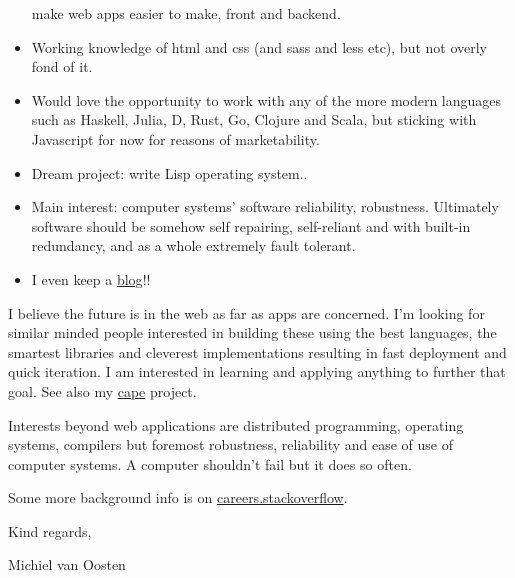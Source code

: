 \documentclass[11pt]{article}
\begin{document}
\begin{itemize}
  make web apps easier to make, front and backend.
\item Working knowledge of html and css (and sass and less etc), but not overly fond of it.
\item Would love the opportunity to work with any of the more modern languages such
  as Haskell, Julia, D, Rust, Go, Clojure and Scala, but sticking with
  Javascript for now for reasons of marketability.
\item Dream project: write Lisp operating system..
\item Main interest: computer systems' software reliability, robustness. Ultimately
  software should be somehow self repairing, self-reliant and with built-in
  redundancy, and as a whole extremely fault tolerant.
\item I even keep a \href{http://www.axion5.net}{blog}!!
\end{itemize}
  
I believe the future is in the web as far as apps are concerned. I'm looking for
similar minded people interested in building these using the best languages, the
smartest libraries and cleverest implementations resulting in fast deployment
and quick iteration. I am interested in learning and applying anything to
further that goal. See also my \href{http://github.com/michieljoris/cape}{cape} project.

Interests beyond web applications are distributed programming, operating
systems, compilers but foremost robustness, reliability and ease of use of
computer systems. A computer shouldn't fail but it does so often.

Some more background info is on \href{http://careers.stackoverflow.com/michieljoris}{careers.stackoverflow}.

Kind regards,

Michiel van Oosten
\end{document}
